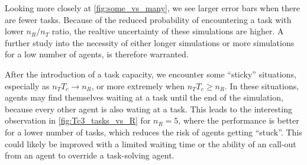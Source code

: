 \documentclass[11pt]{article}
\begin{document}
    Looking more closely at \autoref{fig:some_vs_many}, we see larger error bars 
    when there are fewer tasks.
    Because of the reduced probability of encountering a task with lower $n_R/n_T$
    ratio, the realtive uncertainty of these simulations are higher.
    A further study into the 
    necessity of either longer simulations or more simulations for a low 
    number of agents, is therefore warranted. 

    After the introduction of a task capacity, we encounter some ``sticky'' situations,
    especially as $n_T T_c \to n_R$, or more extremely when $n_T T_c \geq n_R$. In these situations,
    agents may find themselves waiting at a task until the end of the simulation, because 
    every other agent is also wating at a task. This leads to the interesting observation in 
    \autoref{fig:Tc3_tasks_vs_R} for $n_R=5$, where the performance is better for a lower number
    of tasks, which reduces the risk of agents getting ``stuck''. This could likely be improved 
    with a limited waiting time or the ability of an call-out from an agent to override a 
    task-solving agent.

    \printbibliography
\end{document}
